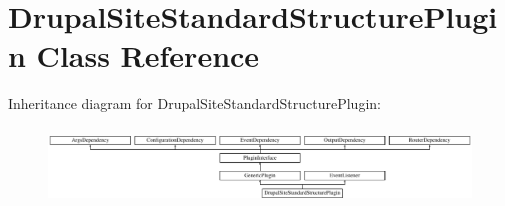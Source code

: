 \hypertarget{classDrupalSiteStandardStructurePlugin}{\section{Drupal\-Site\-Standard\-Structure\-Plugin Class Reference}
\label{classDrupalSiteStandardStructurePlugin}
}
Inheritance diagram for Drupal\-Site\-Standard\-Structure\-Plugin\-:\begin{figure}[H]
\begin{center}
\leavevmode
\includegraphics[height=2.064516cm]{classDrupalSiteStandardStructurePlugin}
\end{center}
\end{figure}
